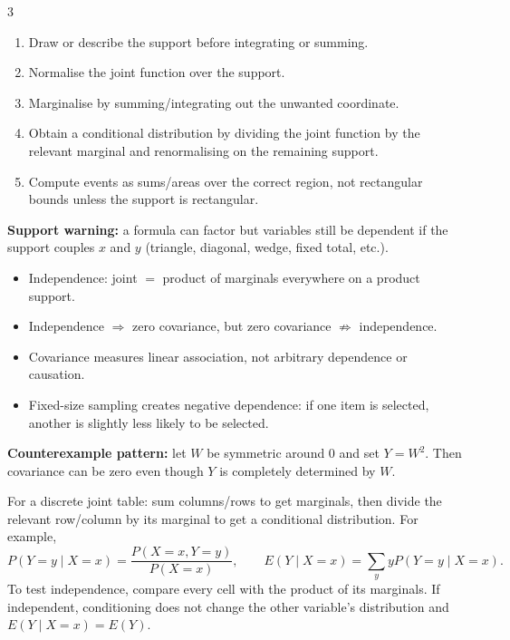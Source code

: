 \documentclass[10pt]{article}
\newcommand{\boxstart}[1]{\begin{tcolorbox}[title={#1},sharp corners]}
\newcommand{\boxend}{\end{tcolorbox}}
\begin{document}
\begin{multicols*}{3}
	\vspace*{-1em}

	\boxstart{L4 — Joint-distribution workflow}
	\begin{enumerate}
		\item Draw or describe the support before integrating or summing.
		\item Normalise the joint function over the support.
		\item Marginalise by summing/integrating out the unwanted coordinate.
		\item Obtain a conditional distribution by dividing the joint function by the relevant marginal and renormalising on the remaining support.
		\item Compute events as sums/areas over the correct region, not rectangular bounds unless the support is rectangular.
	\end{enumerate}
	\textbf{Support warning:} a formula can factor but variables still be dependent if the support couples $x$ and $y$ (triangle, diagonal, wedge, fixed total, etc.).
	\boxend

	\boxstart{L4 — Dependence diagnostics}
	\begin{itemize}
		\item Independence: joint $=$ product of marginals everywhere on a product support.
		\item Independence $\Rightarrow$ zero covariance, but zero covariance $\not\Rightarrow$ independence.
		\item Covariance measures linear association, not arbitrary dependence or causation.
		\item Fixed-size sampling creates negative dependence: if one item is selected, another is slightly less likely to be selected.
	\end{itemize}
	\textbf{Counterexample pattern:} let $W$ be symmetric around 0 and set $Y=W^2$. Then covariance can be zero even though $Y$ is completely determined by $W$.
	\boxend

	\boxstart{L4 — Joint-table exam workflow}
	For a discrete joint table: sum columns/rows to get marginals, then divide the relevant row/column by its marginal to get a conditional distribution. For example,
	\[
		P(Y=y\mid X=x)=\frac{P(X=x,Y=y)}{P(X=x)},
		\qquad
		E(Y\mid X=x)=\sum_y yP(Y=y\mid X=x).
	\]
	To test independence, compare every cell with the product of its marginals. If independent, conditioning does not change the other variable’s distribution and $E(Y\mid X=x)=E(Y)$.
	\boxend


\end{multicols*}
\end{document}
